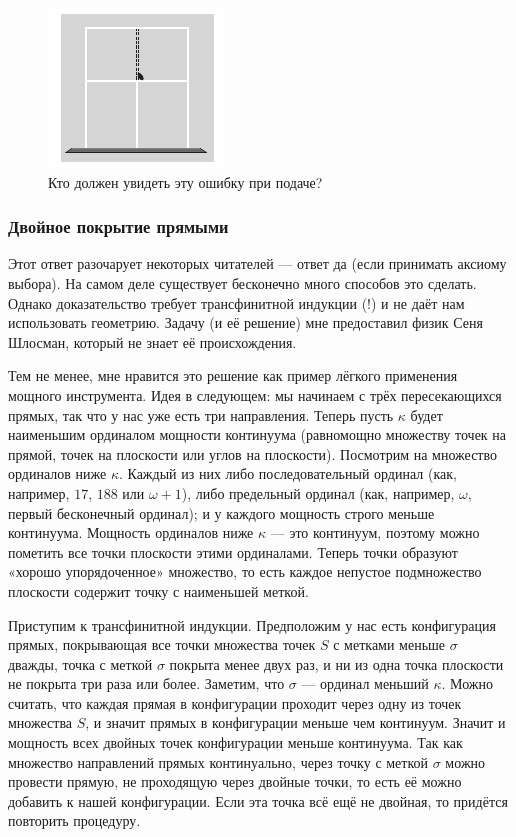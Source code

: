 \begin{figure}[h!]
\centering
\includegraphics[scale=1]{pics/tenis}
\caption{Кто должен увидеть эту ошибку при подаче?}
\label{pic:tenis}
\end{figure}

\subsubsection*{Двойное покрытие прямыми}

Этот ответ разочарует некоторых читателей --- ответ да (если принимать аксиому выбора).
На самом деле существует бесконечно
много способов это сделать.
Однако доказательство требует трансфинитной индукции (!) и не даёт нам использовать геометрию.
Задачу (и её решение) мне предоставил физик Сеня Шлосман, который не знает её происхождения.

Тем не менее, мне нравится это решение как пример лёгкого применения мощного инструмента.
Идея в следующем: мы начинаем с трёх пересекающихся прямых, так что у нас уже есть три направления.
Теперь пусть $\kappa$ будет наименьшим ординалом мощности континуума (равномощно множеству точек на прямой, точек на плоскости или углов на плоскости).
Посмотрим на множество ординалов ниже $\kappa$.
Каждый из них либо последовательный ординал (как, например, $17$, $188$ или $\omega + 1$), либо предельный ординал (как, например, $\omega$, первый бесконечный ординал);
и у каждого мощность строго меньше континуума.
Мощность ординалов ниже $\kappa$ --- это континуум, поэтому можно пометить все точки плоскости этими ординалами. Теперь точки образуют «хорошо упорядоченное» множество, то есть каждое непустое подмножество плоскости содержит точку с наименьшей меткой.


Приступим к трансфинитной индукции.
Предположим у нас есть конфигурация прямых, покрывающая все точки множества точек $S$ с метками меньше $\sigma$ дважды,
точка с меткой $\sigma$ покрыта менее двух раз,
и ни из одна точка плоскости не покрыта три раза или более.
Заметим, что $\sigma$ --- ординал меньший $\kappa$.
Можно считать, что каждая прямая в конфигурации проходит через одну из точек множества $S$, 
и значит прямых в конфигурации меньше чем континуум.
Значит и мощность всех двойных точек конфигурации меньше континуума.
Так как множество направлений прямых континуально, через точку с меткой $\sigma$ можно провести прямую, не проходящую через двойные точки,
то есть её можно добавить к нашей конфигурации.
Если эта точка всё ещё не двойная, то придётся повторить процедуру.

